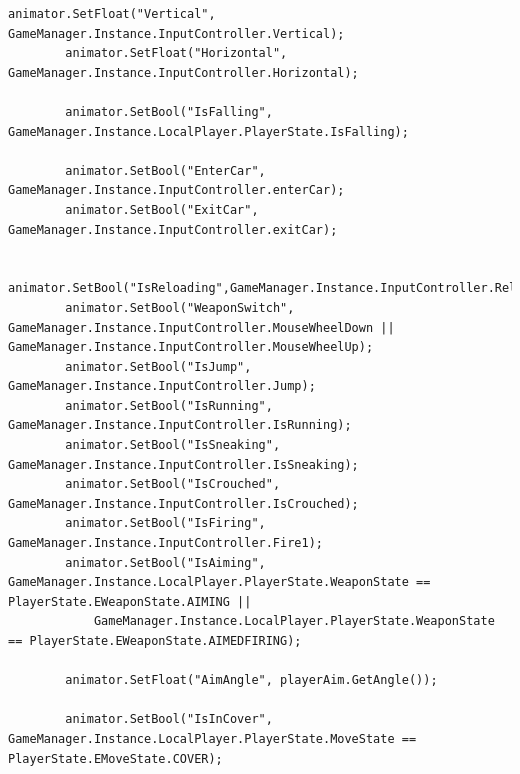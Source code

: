 \begin{lstlisting}[caption={Skripta animacija}, label=Animacije]
animator.SetFloat("Vertical", GameManager.Instance.InputController.Vertical);
        animator.SetFloat("Horizontal", GameManager.Instance.InputController.Horizontal);

        animator.SetBool("IsFalling", GameManager.Instance.LocalPlayer.PlayerState.IsFalling);

        animator.SetBool("EnterCar", GameManager.Instance.InputController.enterCar);
        animator.SetBool("ExitCar", GameManager.Instance.InputController.exitCar);

        animator.SetBool("IsReloading",GameManager.Instance.InputController.Reload);
        animator.SetBool("WeaponSwitch", GameManager.Instance.InputController.MouseWheelDown || GameManager.Instance.InputController.MouseWheelUp);
        animator.SetBool("IsJump", GameManager.Instance.InputController.Jump);
        animator.SetBool("IsRunning", GameManager.Instance.InputController.IsRunning);
        animator.SetBool("IsSneaking", GameManager.Instance.InputController.IsSneaking);
        animator.SetBool("IsCrouched", GameManager.Instance.InputController.IsCrouched);
        animator.SetBool("IsFiring", GameManager.Instance.InputController.Fire1);
        animator.SetBool("IsAiming", GameManager.Instance.LocalPlayer.PlayerState.WeaponState == PlayerState.EWeaponState.AIMING ||
            GameManager.Instance.LocalPlayer.PlayerState.WeaponState == PlayerState.EWeaponState.AIMEDFIRING);

        animator.SetFloat("AimAngle", playerAim.GetAngle());

        animator.SetBool("IsInCover", GameManager.Instance.LocalPlayer.PlayerState.MoveState == PlayerState.EMoveState.COVER);

\end{lstlisting}


